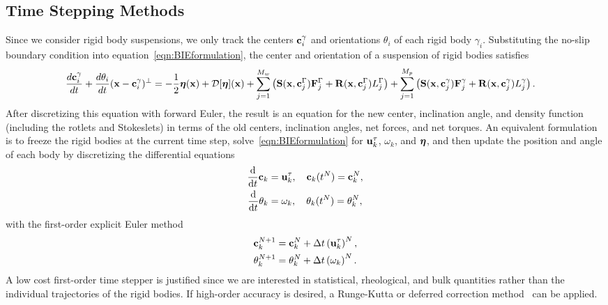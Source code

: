 \documentclass[AMA,STIX1COL]{WileyNJD-v2}
\begin{document}
\subsection{Time Stepping Methods}
\label{sec:temporal}
Since we consider rigid body suspensions, we only track the centers
${\mathbf{c}}_i^\gamma$ and orientations $\theta_i$ of each rigid body
$\gamma_i$.  Substituting the no-slip boundary condition into
equation~\eqref{eqn:BIEformulation}, the center and orientation of a
suspension of rigid bodies satisfies
\begin{align*}
  \frac{d{\mathbf{c}}_i^\gamma}{dt} + \frac{d\theta_i}{dt}
    ({\mathbf{x}} - {\mathbf{c}}_i^\gamma)^\perp &=
    -\frac{1}{2}{\boldsymbol\eta}({\mathbf{x}}) + {\mathcal{D}}[{\boldsymbol\eta}]({\mathbf{x}}) + 
    \sum_{j=1}^{M_w} \left(\mathbf{S}({\mathbf{x}},{\mathbf{c}}^\Gamma_j){\mathbf{F}}^\Gamma_j + 
      \mathbf{R}({\mathbf{x}},{\mathbf{c}}^\Gamma_j)L^\Gamma_j\right) 
    +\sum_{j=1}^{M_p} \left(\mathbf{S}({\mathbf{x}},{\mathbf{c}}^\gamma_j){\mathbf{F}}^\gamma_j +
      \mathbf{R}({\mathbf{x}},{\mathbf{c}}^\gamma_j)L^\gamma_j\right).
\end{align*}
After discretizing this equation with forward Euler, the result is an
equation for the new center, inclination angle, and density function
(including the rotlets and Stokeslets) in terms of the old centers,
inclination angles, net forces, and net torques.  An equivalent
formulation is to freeze the rigid bodies at the current time step,
solve~\eqref{eqn:BIEformulation} for ${\mathbf{u}}^\tau_k$, $\omega_k$, and
${\boldsymbol\eta}$, and then update the position and angle of each body by
discretizing the differential equations
\begin{align*}
  \frac{\text{d}}{\text{d}t}{\mathbf{c}}_k &= {\mathbf{u}}^\tau_k,  
    \quad {\mathbf{c}}_k(t^N) = {\mathbf{c}}_k^N, \\
  \frac{\text{d}}{\text{d}t}\theta_k &= \omega_k,
    \quad \theta_k(t^N) = \theta_k^N,
\end{align*}
with the first-order explicit Euler method
\begin{align*}
  {\mathbf{c}}_k^{N+1} &= {\mathbf{c}}_k^N + \Delta t \left({\mathbf{u}}_k^\tau\right)^N, \\
  \theta_k^{N+1} &= \theta_k^N + \Delta t \left(\omega_k\right)^N.
\end{align*}
A low cost first-order time stepper is justified since we are interested
in statistical, rheological, and bulk quantities rather than the
individual trajectories of the rigid bodies.  If high-order accuracy is
desired, a Runge-Kutta or deferred correction method~\cite{Quaife2015,
qua-bir2016} can be applied.
\end{document}
